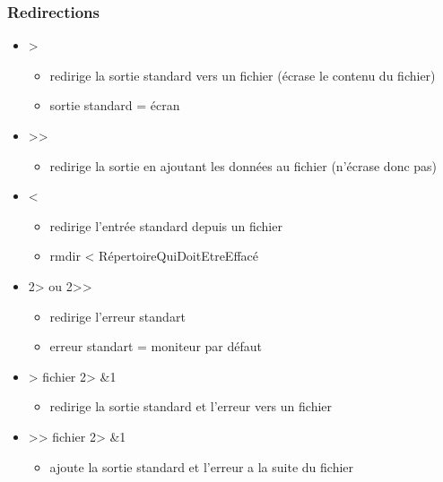\documentclass[a4paper]{article}
\begin{document}
    \subsubsection{Redirections}
    \begin{itemize}[label=\textbullet, font=\Large]
      \item >
      \begin{itemize}[label=, font=\scriptsize]
        \item redirige la sortie standard vers un fichier (écrase le contenu du fichier)
        \item sortie standard = écran
      \end{itemize}
      \item >>
      \begin{itemize}[label=, font=\scriptsize]
        \item redirige la sortie en ajoutant les données au fichier (n'écrase donc pas)
      \end{itemize}
      \item <
      \begin{itemize}[label=, font=\scriptsize]
        \item redirige l'entrée standard depuis un fichier
        \item rmdir < RépertoireQuiDoitEtreEffacé
      \end{itemize}
      \item 2> ou 2>>
      \begin{itemize}[label=, font=\scriptsize]
        \item redirige l'erreur standart
        \item erreur standart = moniteur par défaut
      \end{itemize}
      \item > fichier 2> \&1
      \begin{itemize}[label=, font=\scriptsize]
        \item redirige la sortie standard et l'erreur vers un fichier
      \end{itemize}
      \item >> fichier 2> \&1
      \begin{itemize}[label=, font=\scriptsize]
        \item ajoute la sortie standard et l'erreur a la suite du fichier
      \end{itemize}
    \end{itemize}
\end{document}

